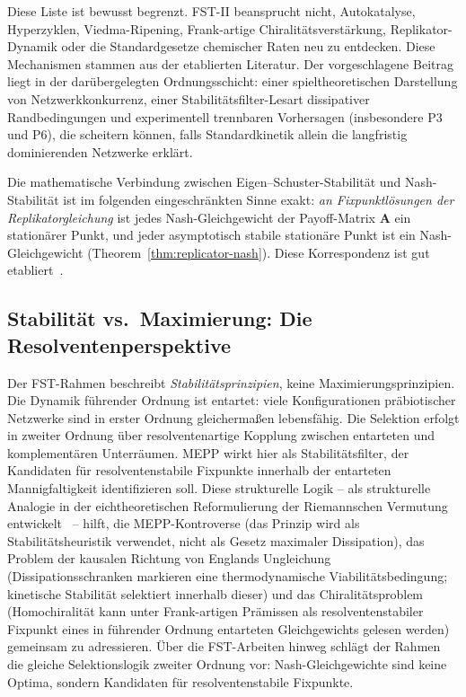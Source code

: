 \documentclass[12pt,a4paper]{article}
\theoremstyle{remark}
\begin{document}
Diese Liste ist bewusst begrenzt. FST-II beansprucht nicht, Autokatalyse, Hyperzyklen, Viedma-Ripening, Frank-artige Chiralitätsverstärkung, Replikator-Dynamik oder die Standardgesetze chemischer Raten neu zu entdecken. Diese Mechanismen stammen aus der etablierten Literatur. Der vorgeschlagene Beitrag liegt in der darübergelegten Ordnungsschicht: einer spieltheoretischen Darstellung von Netzwerkkonkurrenz, einer Stabilitätsfilter-Lesart dissipativer Randbedingungen und experimentell trennbaren Vorhersagen (insbesondere P3 und P6), die scheitern können, falls Standardkinetik allein die langfristig dominierenden Netzwerke erklärt.

Die mathematische Verbindung zwischen Eigen--Schuster-Stabilität und Nash-Stabilität ist im folgenden eingeschränkten Sinne exakt: \emph{an Fixpunktlösungen der Replikatorgleichung} ist jedes Nash-Gleichgewicht der Payoff-Matrix $\mathbf{A}$ ein stationärer Punkt, und jeder asymptotisch stabile stationäre Punkt ist ein Nash-Gleichgewicht (Theorem~\ref{thm:replicator-nash}). Diese Korrespondenz ist gut etabliert~\citep{HofbauerSigmund2003}.

\subsection{Stabilität vs.\ Maximierung: Die Resolventenperspektive}

Der FST-Rahmen beschreibt \emph{Stabilitätsprinzipien}, keine Maximierungsprinzipien. Die Dynamik führender Ordnung ist entartet: viele Konfigurationen präbiotischer Netzwerke sind in erster Ordnung gleichermaßen lebensfähig. Die Selektion erfolgt in zweiter Ordnung über resolventenartige Kopplung zwischen entarteten und komplementären Unterräumen. MEPP wirkt hier als Stabilitätsfilter, der Kandidaten für resolventenstabile Fixpunkte innerhalb der entarteten Mannigfaltigkeit identifizieren soll. Diese strukturelle Logik -- als strukturelle Analogie in der eichtheoretischen Reformulierung der Riemannschen Vermutung entwickelt~\citep{GeigerRH2026b} -- hilft, die MEPP-Kontroverse (das Prinzip wird als Stabilitätsheuristik verwendet, nicht als Gesetz maximaler Dissipation), das Problem der kausalen Richtung von Englands Ungleichung (Dissipationsschranken markieren eine thermodynamische Viabilitätsbedingung; kinetische Stabilität selektiert innerhalb dieser) und das Chiralitätsproblem (Homochiralität kann unter Frank-artigen Prämissen als resolventenstabiler Fixpunkt eines in führender Ordnung entarteten Gleichgewichts gelesen werden) gemeinsam zu adressieren. Über die FST-Arbeiten hinweg schlägt der Rahmen die gleiche Selektionslogik zweiter Ordnung vor: Nash-Gleichgewichte sind keine Optima, sondern Kandidaten für resolventenstabile Fixpunkte.
\end{document}
